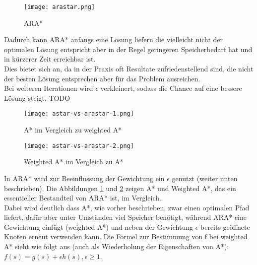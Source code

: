 \documentclass[oribibl]{llncs}
\begin{document}
\begin{figure}
	\centering
  \texttt{[image: arastar.png]}
	\caption{ARA*}
	\cite{SBPLRosSchool}
\end{figure}
Dadurch kann ARA* anfangs eine Lösung liefern die vielleicht nicht der optimalen Lösung entspricht aber in der Regel geringeren Speicherbedarf hat und in kürzerer Zeit erreichbar ist.\\
Dies bietet sich an, da in der Praxis oft Resultate zufriedenstellend sind, die nicht der besten Lösung entsprechen aber für das Problem ausreichen.\\
Bei weiteren Iterationen wird $\epsilon$ verkleinert, sodass die Chance auf eine bessere Lösung steigt.
TODO
\begin{figure}
	\centering
  \texttt{[image: astar-vs-arastar-1.png]}
	\caption{A* im Vergleich zu weighted A*}
	\cite{SBPLRosSchool}
	\label{astarvsarastar1}
\end{figure}
\begin{figure}
	\centering
  \texttt{[image: astar-vs-arastar-2.png]}
	\caption{Weighted A* im Vergleich zu A*}
	\cite{SBPLRosSchool}
	\label{astarvsarastar2}
\end{figure}
In ARA* wird zur Beeinflussung der Gewichtung ein $\epsilon$ genutzt (weiter unten beschrieben). Die Abbildungen \ref{astarvsarastar1} und \ref{astarvsarastar2} zeigen A* und Weighted A*, das ein essentieller Bestandteil von ARA* ist, im Vergleich.\\
Dabei wird deutlich dass A*, wie vorher beschrieben, zwar einen optimalen Pfad liefert, dafür aber unter Umständen viel Speicher benötigt, während ARA* eine Gewichtung einfügt (weighted A*) und neben der Gewichtung $\epsilon$ bereits geöffnete Knoten erneut verwenden kann.
\newpage
Die Formel zur Bestimmung von f bei weighted A* sieht wie folgt aus (auch als Wiederholung der Eigenschaften von A*):\\
$f(s) = g(s) + \epsilon h(s), \epsilon \geq 1$.
\end{document}
